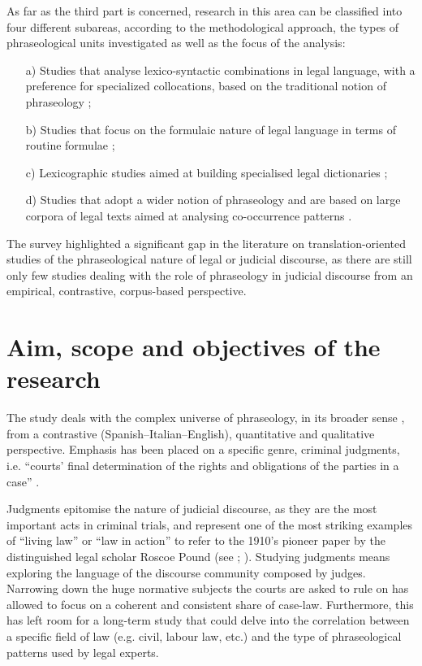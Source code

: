 \documentclass[output=paper]{LSP/langsci}
\begin{document}
As far as the third part is concerned, research in this area can be classified into four different subareas, according to the methodological approach, the types of phraseological units investigated as well as the focus of the analysis:

\begin{enumerate}
\item[a)] Studies that analyse lexico-syntactic combinations in legal language, with a preference for specialized collocations, based on the traditional notion of phraseology \citep{Benson1986,Hausmann1989,Corpas1996,Berdychowska1999, Nardon2002,Lombardi2004,Rovere1999,Nystedt2000,Cruz2002,Giráldez2007,
Anderson2006,Montenegro2007,Biel2011,Bhatia2004};      
\item[b)] Studies that focus on the formulaic nature of legal language in terms of routine formulae \citep{Rega2000,Bachmann2000,Monzo2001,Carvalho2007,Giurizzato2008};
\item[c)] Lexicographic studies aimed at building specialised legal dictionaries \citep{Groot1999,François1997,Gisbert2008,Fernández2008};
\item[d)] Studies that adopt a wider notion of phraseology and are based on large corpora of legal texts aimed at analysing co-occurrence patterns \citep{Mazzi2005,Mazzi2010,GozdzRoszkowski2011}.
\end{enumerate}

The survey highlighted a significant gap in the literature on translation-orient\-ed studies of the phraseological nature of legal or judicial discourse, as there are still only few studies dealing with the role of phraseology in judicial discourse from an empirical, contrastive, corpus-based perspective. 

\section{Aim, scope and objectives of the research}
The study deals with the complex universe of phraseology, in its broader sense \citep[see][6]{Gries2008}, from a contrastive (Spanish--Italian--English), quantitative and qualitative perspective. Emphasis has been placed on a specific genre, criminal judgments, i.e. “courts’ final determination of the rights and obligations of the parties in a case” \citep[see][918]{Bryan2009}.

Judgments epitomise the nature of judicial discourse, as they are the most important acts in criminal trials, and represent one of the most striking examples of “living law” or “law in action” to refer to the 1910’s pioneer paper by the distinguished legal scholar Roscoe Pound (see \citealt[154]{Garavelli2010}; \citealt[253]{Cadoppi1999}). Studying judgments means exploring the language of the discourse community composed by judges. Narrowing down the huge normative subjects the courts are asked to rule on has allowed to focus on a coherent and consistent share of case-law. Furthermore, this has left room for a long-term study that could delve into the correlation between a specific field of law (e.g. civil, labour law, etc.) and the type of phraseological patterns used by legal experts.
\end{document}
